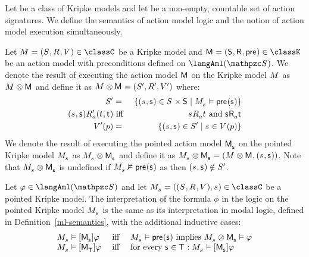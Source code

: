 \begin{definition}\label{aml-semantics}
Let \classC{} be a class of Kripke models and let \aSignatureFamily{} be a non-empty, countable set of action signatures.
We define the semantics of action model logic and the notion of action model execution simultaneously.

Let $\kModelAndTuple \in \classC$ be a Kripke model and $\aModelAndTuple \in \classK$ be an action model with preconditions defined on $\langAml(\aSignatureFamily)$.
We denote the result of executing the action model $\aModel$ on the Kripke model $\kModel$ as $\kModel \exec \aModel$ and define it as $\kModel \exec \aModel = \kModelTupleP$ where:
\begin{eqnarray*}
    \kStatesP &=& \{(\kStateS, \aStateS) \in \kStates \times \aStates \mid \kPModel{\kStateS} \entails \aPrecondition(\aStateS)\}\\
    (\kStateS, \aStateS) \kAccessibilityPA (\kStateT, \aStateT) &\text{ iff }& \kStateS \kAccessibilityA \kStateT \text{ and } \aStateS \aAccessibilityA \aStateT\\
    \kValuationP(\atomP) &=& \{(\kStateS, \aStateS) \in \kStatesP \mid \kStateS \in \kValuation(\atomP)\}
\end{eqnarray*}
We denote the result of executing the pointed action model $\aPModel{\aStateS}$ on the pointed Kripke model $\kPModel{\kStateS}$ as $\kPModel{\kStateS} \exec \aPModel{\aStateS}$ and define it as $\kPModel{\kStateS} \exec \aPModel{\aStateS} = (\kModel \exec \aModel, (\kStateS, \aStateS))$. Note that $\kPModel{\kStateS} \exec \aPModel{\aStateS}$ is undefined if $\kPModel{\kStateS} \nentails \aPrecondition(\aStateS)$ as then $(\kStateS, \aStateS) \notin \kStatesP$.

Let $\phi \in \langAml(\aSignatureFamily)$ and let $\kPModelAndTuple{\kStateS} \in \classC$ be a pointed Kripke model.
The interpretation of the formula $\phi$ in the logic \logicAmlC{} on the pointed Kripke model $\kPModel{\kStateS}$ is the same as its interpretation in modal logic, defined in Definition~\ref{ml-semantics}, with the additional inductive cases:
$$
\begin{array}{lcl}
    \kPModel{\kStateS} \entails \actionA{\aPModel{\aStateS}} \phi & \text { iff } & \kPModel{\kStateS} \entails \aPrecondition(\aStateS) \text{ implies } \kPModel{\kStateS} \exec \aPModel{\aStateS} \entails \phi\\
    \kPModel{\kStateS} \entails \actionA{\aPModel{\aStatesT}} \phi & \text { iff } & \text{for every } \aStateS \in \aStatesT: \kPModel{\kStateS} \entails \actionA{\aPModel{\aStateS}} \phi
\end{array}
$$
\end{definition}


